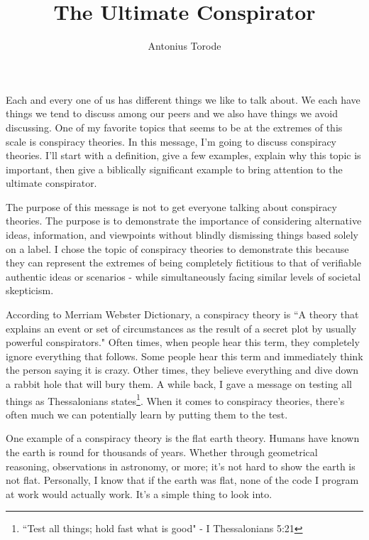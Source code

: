 \documentclass[9.5pt]{article}
\title{The Ultimate Conspirator}
\author{Antonius Torode}
\begin{document}
\maketitle
\thispagestyle{fancy}

\begin{multicols}{2}

Each and every one of us has different things we like to talk about. We each have things we tend to discuss among our peers and we also have things we avoid discussing. One of my favorite topics that seems to be at the extremes of this scale is conspiracy theories. In this message, I'm going to discuss conspiracy theories. I'll start with a definition, give a few examples, explain why this topic is important, then give a biblically significant example to bring attention to the ultimate conspirator.

The purpose of this message is not to get everyone talking about conspiracy theories. The purpose is to demonstrate the importance of considering alternative ideas, information, and viewpoints without blindly dismissing things based solely on a label. I chose the topic of conspiracy theories to demonstrate this because they can represent the extremes of being completely fictitious to that of verifiable authentic ideas or scenarios - while simultaneously facing similar levels of societal skepticism. 

According to Merriam Webster Dictionary, a conspiracy theory is ``A theory that explains an event or set of circumstances as the result of a secret plot by usually powerful conspirators." Often times, when people hear this term, they completely ignore everything that follows. Some people hear this term and immediately think the person saying it is crazy. Other times, they believe everything and dive down a rabbit hole that will bury them. A while back, I gave a message on testing all things\cite{testAllThings} as Thessalonians states\footnote{``Test all things; hold fast what is good" - I Thessalonians 5:21}. When it comes to conspiracy theories, there's often much we can potentially learn by putting them to the test.

One example of a conspiracy theory is the flat earth theory. Humans have known the earth is round for thousands of years. Whether through geometrical reasoning, observations in astronomy, or more; it's not hard to show the earth is not flat. Personally, I know that if the earth was flat, none of the code I program at work would actually work. It's a simple thing to look into. 


\end{multicols}
\end{document}
